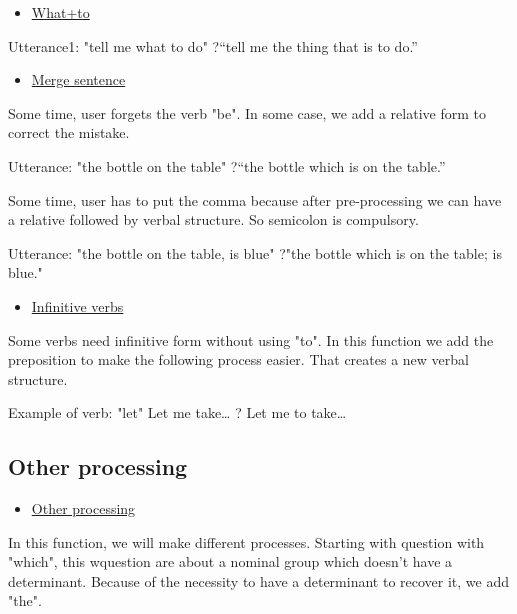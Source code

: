 \documentclass[twoside,a4paper,10pt]{report}
\begin{document}
\begin{itemize}
    \item  \underline{What+to}
\end{itemize}
    Utterance1: "tell me what to do"
    ?“tell me the thing that is to do.”



\begin{itemize}
    \item  \underline{Merge sentence}
\end{itemize}
Some time, user forgets the verb "be". In some case, we add a relative form to correct the mistake.


\small
\begin{verbatimtab}
  Utterance: "the bottle on the table" 
  ?“the bottle which is on the table.”
\end{verbatimtab}
\normalsize
Some time, user has to put the comma because after pre-processing we can have a relative followed by verbal structure. So semicolon is compulsory.


\small
\begin{verbatimtab}
  Utterance: "the bottle on the table, is blue" 
  ?"the bottle which is on the table; is blue."
\end{verbatimtab}
\normalsize

\begin{itemize}
    \item  \underline{Infinitive verbs}
\end{itemize}
Some verbs need infinitive form without using "to". In this function we add the preposition to make the following process easier. That creates a new verbal structure.


\small
\begin{verbatimtab}
 Example of verb: "let"
 Let me take… ? Let me to take… 
\end{verbatimtab}
\normalsize

\subsection{Other processing}
\label{b5a7a96e3b75d0ff95064af9e93e7927}%

\begin{itemize}
    \item  \underline{Other processing}
\end{itemize}
In this function, we will make different processes. Starting with question with "which", this w{\textunderscore}question are about a nominal group which doesn’t have a determinant. Because of the necessity to have a determinant to recover it, we add "the".
\end{document}
